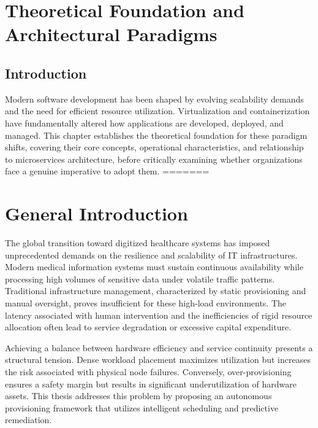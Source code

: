 \documentclass[12pt,a4paper]{report}
\begin{document}
\chapter{Theoretical Foundation and Architectural Paradigms}
\label{chap:theory}

\section{Introduction}

Modern software development has been shaped by evolving scalability demands and the
need for efficient resource utilization. Virtualization and containerization have
fundamentally altered how applications are developed, deployed, and managed. This
chapter establishes the theoretical foundation for these paradigm shifts, covering
their core concepts, operational characteristics, and relationship to microservices
architecture, before critically examining whether organizations face a genuine
imperative to adopt them.
=======
\tableofcontents
\listoffigures
\listoftables

\setcounter{page}{1}

\chapter*{General Introduction}

The global transition toward digitized healthcare systems has imposed unprecedented demands on the resilience and scalability of IT infrastructures. Modern medical information systems must sustain continuous availability while processing high volumes of sensitive data under volatile traffic patterns. Traditional infrastructure management, characterized by static provisioning and manual oversight, proves insufficient for these high-load environments. The latency associated with human intervention and the inefficiencies of rigid resource allocation often lead to service degradation or excessive capital expenditure.

Achieving a balance between hardware efficiency and service continuity presents a structural tension. Dense workload placement maximizes utilization but increases the risk associated with physical node failures. Conversely, over-provisioning ensures a safety margin but results in significant underutilization of hardware assets. This thesis addresses this problem by proposing an autonomous provisioning framework that utilizes intelligent scheduling and predictive remediation.
\end{document}
